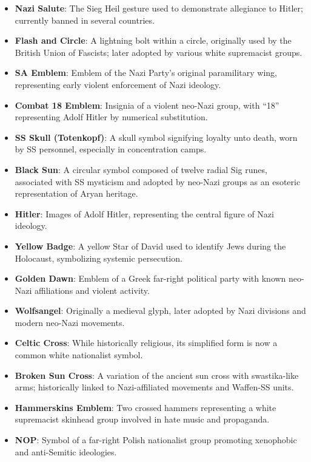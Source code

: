 \begin{itemize}
  \item \textbf{Nazi Salute}: The Sieg Heil gesture used to demonstrate allegiance to Hitler; currently banned in
  several countries.
  \item \textbf{Flash and Circle}: A lightning bolt within a circle, originally used by the British Union of
  Fascists; later adopted by various white supremacist groups.
  \item \textbf{\ac{SA} Emblem}: Emblem of the Nazi Party's original paramilitary wing, representing
  early violent enforcement of Nazi ideology.
  \item \textbf{Combat 18 Emblem}: Insignia of a violent neo-Nazi group, with “18” representing Adolf Hitler by
  numerical substitution.
  \item \textbf{\ac{SS} Skull (Totenkopf)}: A skull symbol signifying loyalty unto death, worn by \ac{SS} personnel,
  especially in concentration camps.
  \item \textbf{Black Sun}: A circular symbol composed of twelve radial Sig runes, associated with \ac{SS}
  mysticism and adopted by neo-Nazi groups as an esoteric representation of Aryan heritage.
  \item \textbf{Hitler}: Images of Adolf Hitler, representing the central figure of Nazi ideology.
  \item \textbf{Yellow Badge}: A yellow Star of David used to identify Jews during the Holocaust, symbolizing
  systemic persecution.
  \item \textbf{Golden Dawn}: Emblem of a Greek far-right political party with known neo-Nazi affiliations and
  violent activity.
  \item \textbf{Wolfsangel}: Originally a medieval glyph, later adopted by Nazi divisions and modern neo-Nazi movements.
  \item \textbf{Celtic Cross}: While historically religious, its simplified form is now a common white nationalist
  symbol.
  \item \textbf{Broken Sun Cross}: A variation of the ancient sun cross with swastika-like arms; historically linked
  to Nazi-affiliated movements and Waffen-SS units.
  \item \textbf{Hammerskins Emblem}: Two crossed hammers representing a white supremacist skinhead group involved in
  hate music and propaganda.
  \item \textbf{\ac{NOP}}: Symbol of a far-right Polish nationalist group promoting xenophobic and anti-Semitic
  ideologies.

\end{itemize}
